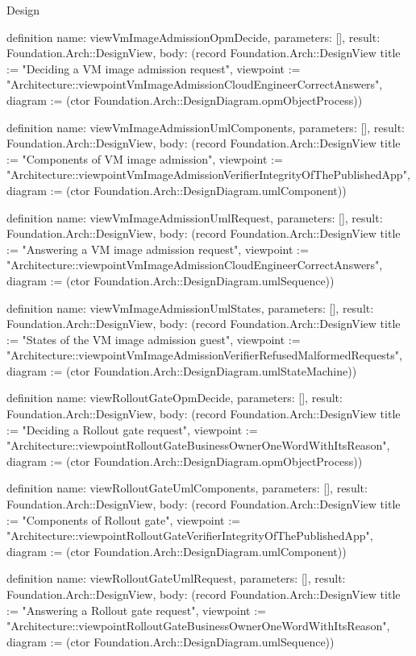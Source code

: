 \begin{lexlean}{Design}
\begin{semanticmodule}
definition{
  name: viewVmImageAdmissionOpmDecide,
  parameters: [],
  result: Foundation.Arch::DesignView,
  body: (record Foundation.Arch::DesignView {title := "Deciding a VM image admission request", viewpoint := "Architecture::viewpointVmImageAdmissionCloudEngineerCorrectAnswers", diagram := (ctor Foundation.Arch::DesignDiagram.opmObjectProcess)})
}

definition{
  name: viewVmImageAdmissionUmlComponents,
  parameters: [],
  result: Foundation.Arch::DesignView,
  body: (record Foundation.Arch::DesignView {title := "Components of VM image admission", viewpoint := "Architecture::viewpointVmImageAdmissionVerifierIntegrityOfThePublishedApp", diagram := (ctor Foundation.Arch::DesignDiagram.umlComponent)})
}

definition{
  name: viewVmImageAdmissionUmlRequest,
  parameters: [],
  result: Foundation.Arch::DesignView,
  body: (record Foundation.Arch::DesignView {title := "Answering a VM image admission request", viewpoint := "Architecture::viewpointVmImageAdmissionCloudEngineerCorrectAnswers", diagram := (ctor Foundation.Arch::DesignDiagram.umlSequence)})
}

definition{
  name: viewVmImageAdmissionUmlStates,
  parameters: [],
  result: Foundation.Arch::DesignView,
  body: (record Foundation.Arch::DesignView {title := "States of the VM image admission guest", viewpoint := "Architecture::viewpointVmImageAdmissionVerifierRefusedMalformedRequests", diagram := (ctor Foundation.Arch::DesignDiagram.umlStateMachine)})
}

definition{
  name: viewRolloutGateOpmDecide,
  parameters: [],
  result: Foundation.Arch::DesignView,
  body: (record Foundation.Arch::DesignView {title := "Deciding a Rollout gate request", viewpoint := "Architecture::viewpointRolloutGateBusinessOwnerOneWordWithItsReason", diagram := (ctor Foundation.Arch::DesignDiagram.opmObjectProcess)})
}

definition{
  name: viewRolloutGateUmlComponents,
  parameters: [],
  result: Foundation.Arch::DesignView,
  body: (record Foundation.Arch::DesignView {title := "Components of Rollout gate", viewpoint := "Architecture::viewpointRolloutGateVerifierIntegrityOfThePublishedApp", diagram := (ctor Foundation.Arch::DesignDiagram.umlComponent)})
}

definition{
  name: viewRolloutGateUmlRequest,
  parameters: [],
  result: Foundation.Arch::DesignView,
  body: (record Foundation.Arch::DesignView {title := "Answering a Rollout gate request", viewpoint := "Architecture::viewpointRolloutGateBusinessOwnerOneWordWithItsReason", diagram := (ctor Foundation.Arch::DesignDiagram.umlSequence)})
}


\end{semanticmodule}
\end{lexlean}
